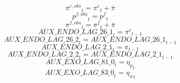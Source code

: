 \begin{dmath}
{{\pi^{e,obs}}}_{t}={{\pi^{e}}}_{t}+{{\bar{\pi}}}
\end{dmath}
\begin{dmath}
{{p^{f,obs}}}_{t}={{p^{f}}}_{t}
\end{dmath}
\begin{dmath}
{{\pi^{f,obs}}}_{t}={{\pi^{f}}}_{t}+{{\bar{\pi}}}
\end{dmath}
\begin{dmath}
{AUX\_ENDO\_LAG\_26\_1}_{t}={{\pi^{c}}}_{t-1}
\end{dmath}
\begin{dmath}
{AUX\_ENDO\_LAG\_26\_2}_{t}={AUX\_ENDO\_LAG\_26\_1}_{t-1}
\end{dmath}
\begin{dmath}
{AUX\_ENDO\_LAG\_2\_1}_{t}={{\pi}}_{t-1}
\end{dmath}
\begin{dmath}
{AUX\_ENDO\_LAG\_2\_2}_{t}={AUX\_ENDO\_LAG\_2\_1}_{t-1}
\end{dmath}
\begin{dmath}
{AUX\_EXO\_LAG\_81\_0}_{t}={{\eta_{p}}}_{t}
\end{dmath}
\begin{dmath}
{AUX\_EXO\_LAG\_83\_0}_{t}={{\eta_{w}}}_{t}
\end{dmath}
